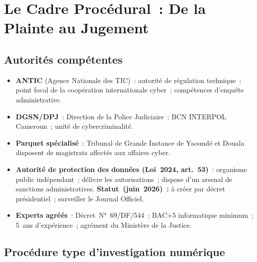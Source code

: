\section{Le Cadre Procédural~: De la Plainte au Jugement}
\label{sec:procedure}

\subsection{Autorités compétentes}

\begin{itemize}
    \item \textbf{ANTIC} (Agence Nationale des TIC)~: autorité de régulation
          technique~; point focal de la coopération internationale cyber~;
          compétences d'enquête administrative.
    \item \textbf{DGSN/DPJ}~: Direction de la Police Judiciaire~;
          BCN INTERPOL Cameroun~; unité de cybercriminalité.
    \item \textbf{Parquet spécialisé}~: Tribunal de Grande Instance de Yaoundé
          et Douala disposent de magistrats affectés aux affaires cyber.
    \item \textbf{Autorité de protection des données (Loi~2024, art.~53)}~:
          organisme public indépendant~; délivre les autorisations~;
          dispose d'un arsenal de sanctions administratives.
          \textbf{Statut~(juin~2026)~:} à créer par décret présidentiel~;
          surveiller le Journal Officiel.
    \item \textbf{Experts agréés}~: Décret~N°~69/DF/544~; BAC+5 informatique
          minimum~; 5~ans d'expérience~; agrément du Ministère de la Justice.
\end{itemize}

\subsection{Procédure type d'investigation numérique}

